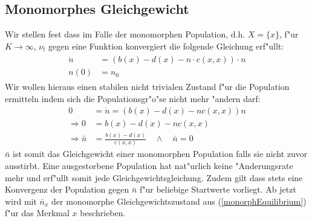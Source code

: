 \documentclass[11pt, a4paper, german]{article}
\theoremstyle{plain}
\begin{document}
	\subsection{Monomorphes Gleichgewicht}
	Wir stellen fest dass im Falle der monomorphen Population, d.h. $ X = \{x\} $, f"ur $ K \to \infty $, $ \nu_t $ gegen eine Funktion konvergiert die folgende Gleichung erf"ullt:
	\begin{align}
	\begin{split}
		\dot{n} &= (b(x) - d(x) - n \cdot c(x,x)) \cdot n \\
		n(0) &= n_0
	\end{split}
	\end{align}
	Wir wollen hieraus einen stabilen nicht trivialen Zustand f"ur die Population ermitteln indem sich die Populationsgr"o"se nicht mehr "andern darf:
	\begin{align}
		0 &= \dot{n} = (b(x) - d(x) - nc(x,x))n \nonumber\\
		\Rightarrow 0 &= b(x) - d(x) - nc(x,x) \nonumber\\
		\Rightarrow \bar{n} &= \frac{b(x) - d(x)}{c(x,x)} \quad \wedge \quad \bar{n} = 0 \label{monorphEquilibrium}
	\end{align}
	$ \bar{n} $ ist somit das Gleichgewicht einer monomorphen Population falls sie nicht zuvor ausstirbt. Eine ausgestorbene Population hat nat"urlich keine "Anderungsrate mehr und erf"ullt somit jede Gleichgewichtsgleichung. Zudem gilt dass stets eine Konvergenz der Population gegen $ \bar{n} $ f"ur beliebige Startwerte vorliegt.
	Ab jetzt wird mit $ \bar{n}_x $ der monomorphe Gleichgewichtszustand aus (\ref{monorphEquilibrium}) f"ur das Merkmal $ x $ beschrieben.
	
\end{document}
